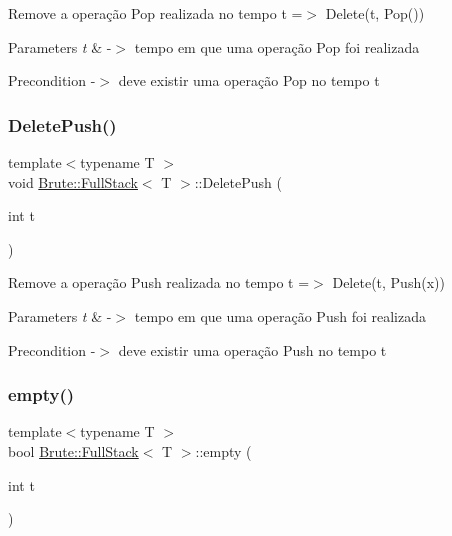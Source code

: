 Remove a operação Pop realizada no tempo t =$>$ Delete(t, Pop())


\begin{DoxyParams}{Parameters}
{\em t} & -\/$>$ tempo em que uma operação Pop foi realizada \\
\hline
\end{DoxyParams}
\begin{DoxyPrecond}{Precondition}
-\/$>$ deve existir uma operação Pop no tempo t 
\end{DoxyPrecond}
\mbox{\label{classBrute_1_1FullStack_af5b113d29c107b6c6271ed07e2d715c4}} 
\subsubsection{\texorpdfstring{Delete\+Push()}{DeletePush()}}
{\footnotesize\ttfamily template$<$typename T $>$ \\
void \hyperlink{classBrute_1_1FullStack}{Brute\+::\+Full\+Stack}$<$ T $>$\+::Delete\+Push (\begin{DoxyParamCaption}\item[{int}]{t }\end{DoxyParamCaption})}

Remove a operação Push realizada no tempo t =$>$ Delete(t, Push(x))


\begin{DoxyParams}{Parameters}
{\em t} & -\/$>$ tempo em que uma operação Push foi realizada \\
\hline
\end{DoxyParams}
\begin{DoxyPrecond}{Precondition}
-\/$>$ deve existir uma operação Push no tempo t 
\end{DoxyPrecond}
\mbox{\label{classBrute_1_1FullStack_abad599473f0e06b91d4cf5a5909bb58c}} 
\subsubsection{\texorpdfstring{empty()}{empty()}}
{\footnotesize\ttfamily template$<$typename T $>$ \\
bool \hyperlink{classBrute_1_1FullStack}{Brute\+::\+Full\+Stack}$<$ T $>$\+::empty (\begin{DoxyParamCaption}\item[{int}]{t }\end{DoxyParamCaption})}

